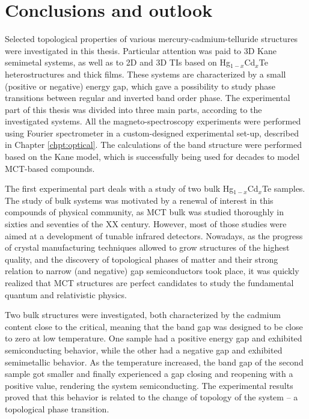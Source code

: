 \documentclass[titlepage,a4paper]{book}
\newcommand{\wciecie}{\quad\phantom{v}}
\begin{document}
\chapter{Conclusions and outlook}
\wciecie
Selected topological properties of various mercury-cadmium-telluride structures were investigated in this thesis. Particular attention was paid to 3D Kane semimetal systems, as well as to 2D and 3D TIs based on Hg$_{1-x}$Cd$_{x}$Te heterostructures and thick films. These systems are characterized by a small (positive or negative) energy gap, which gave a possibility to study phase transitions between regular and inverted band order phase. The experimental part of this thesis was divided into three main parts, according to the investigated systems. All the magneto-spectroscopy experiments were performed using Fourier spectrometer in a custom-designed experimental set-up, described in Chapter \ref{chpt:optical}. The calculations of the band structure were performed based on the Kane model, which is successfully being used for decades to model MCT-based compounds.
\vspace{5mm}

The first experimental part deals with a study of two bulk Hg$_{1-x}$Cd$_{x}$Te samples. The study of bulk systems was motivated by a renewal of interest in this compounds of physical community, as MCT bulk was studied thoroughly in sixties and seventies of the XX century. However, most of those studies were aimed at a development of tunable infrared detectors. Nowadays, as the progress of crystal manufacturing techniques allowed to grow structures of the highest quality, and the discovery of topological phases of matter and their strong relation to narrow (and negative) gap semiconductors took place, it was quickly realized that MCT structures are perfect candidates to study the fundamental quantum and relativistic physics. 

Two bulk structures were investigated, both characterized by the cadmium content close to the critical, meaning that the band gap was designed to be close to zero at low temperature.
One sample had a positive energy gap and exhibited semiconducting behavior, while the other had a negative gap and exhibited semimetallic behavior. As the temperature increased, the band gap of the second sample got smaller and finally experienced a gap closing and reopening with a positive value, rendering the system semiconducting. The experimental results proved that this behavior is related to the change of topology of the system -- a topological phase transition.
\end{document}
